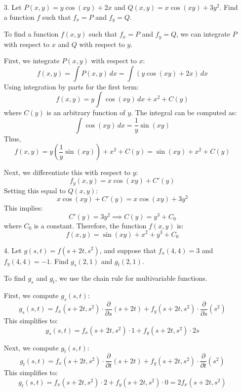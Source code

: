 \documentclass[reqno, 12pt]{amsart}
\begin{document}
\begin{itemize}
    \newpage
  \item[3.] Let $\displaystyle P(x,y) = y\cos(xy)+2x$ and $\displaystyle Q(x,y) = x\cos(xy)+3y^2$. Find a function $f$ such that $f_x = P$ and $f_y = Q$.
    \newline

    \begin{answerbox}
      To find a function $f(x,y)$ such that $f_x = P$ and $f_y = Q$, we can integrate $P$ with respect to $x$ and $Q$ with respect to $y$.

      First, we integrate $P(x,y)$ with respect to $x$:
      \[
        f(x,y) = \int P(x,y) \, dx = \int (y\cos(xy) + 2x) \, dx
      \]
      Using integration by parts for the first term:
      \[
        f(x,y) = y \int \cos(xy) \, dx + x^2 + C(y)
      \]
      where $C(y)$ is an arbitrary function of $y$. The integral can be computed as:
      \[
        \int \cos(xy) \, dx = \frac{1}{y} \sin(xy)
      \]
      Thus,
      \[
        f(x,y) = y \left( \frac{1}{y} \sin(xy) \right) + x^2 + C(y) = \sin(xy) + x^2 + C(y)
      \]

      Next, we differentiate this with respect to $y$:
      \[
        f_y(x,y) = x \cos(xy) + C'(y)
      \]
      Setting this equal to $Q(x,y)$:
      \[
        x \cos(xy) + C'(y) = x \cos(xy) + 3y^2
      \]
      This implies:
      \[
        C'(y) = 3y^2 \implies C(y) = y^3 + C_0
      \]
      where $C_0$ is a constant. Therefore, the function $f(x,y)$ is:
      \[
        f(x,y) = \sin(xy) + x^2 + y^3 + C_0
      \]

    \end{answerbox}
    \vspace{0.5 in}
    \newpage
  \item[4.] Let $g(s,t) = f(s+2t, s^2)$, and suppose that $f_x(4,4) = 3$ and $f_y(4,4) = -1$. Find $g_s(2,1)$ and $g_t(2,1)$.
    \newline

    \begin{answerbox}
        To find $g_s$ and $g_t$, we use the chain rule for multivariable functions.
    
        First, we compute $g_s(s,t)$:
        \[
            g_s(s,t) = f_x(s+2t, s^2) \cdot \frac{\partial}{\partial s}(s+2t) + f_y(s+2t, s^2) \cdot \frac{\partial}{\partial s}(s^2)
        \]
        This simplifies to:
        \[
            g_s(s,t) = f_x(s+2t, s^2) \cdot 1 + f_y(s+2t, s^2) \cdot 2s
        \]
    
        Next, we compute $g_t(s,t)$:
        \[
            g_t(s,t) = f_x(s+2t, s^2) \cdot \frac{\partial}{\partial t}(s+2t) + f_y(s+2t, s^2) \cdot \frac{\partial}{\partial t}(s^2)
        \]
        This simplifies to:
        \[
            g_t(s,t) = f_x(s+2t, s^2) \cdot 2 + f_y(s+2t, s^2) \cdot 0 = 2f_x(s+2t, s^2)
        \]
    

\end{answerbox}
\end{itemize}
\end{document}
